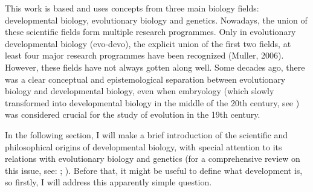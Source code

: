 This work is based and uses concepts from three main biology fields: 
developmental biology, evolutionary biology and genetics.
Nowadays, the union of these scientific fields form multiple research programmes. 
Only in evolutionary developmental biology (evo-devo), the explicit union of the first two fields, at least four major research programmes have been recognized (Muller, 2006).
However, these fields have not always gotten along well. 
Some decades ago, there was a clear conceptual and epistemological separation between evolutionary biology and developmental biology, even when embryology (which slowly transformed into developmental biology in the middle of the 20th century, see \citealp{Horder2010}) was considered crucial for the study of evolution in the 19th century.

In the following section, I will make a brief introduction of the scientific and philosophical origins of developmental biology, with special attention to its relations with evolutionary biology and genetics (for a comprehensive review on this issue, see: \citealp{amundson2005changing}; \citealp{gilbert1991conceptual}).
Before that, it might be useful to define what development is, so firstly, I will address this apparently simple question.